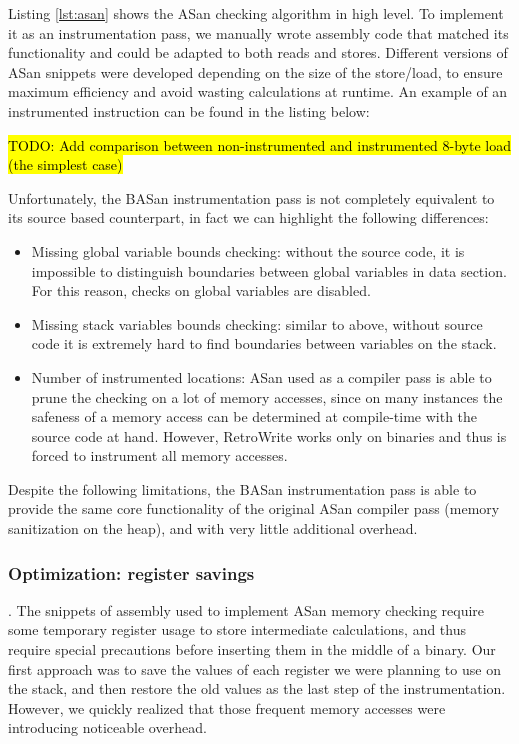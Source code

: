 \documentclass[a4paper,11pt,oneside]{report}
\newcommand{\sysname}{RetroWrite\xspace}
\newcommand{\todo}[1]{%
	\begingroup 
	\sethlcolor{cyan}%
	\hl{TODO: #1}%
	\endgroup
}
\begin{document}
Listing \ref{lst:asan} shows the ASan checking algorithm in high level. To 
implement it as an instrumentation pass, we manually wrote assembly code that 
matched its functionality and could be adapted to both reads and stores.  
Different versions of ASan snippets were developed depending on the size of the 
store/load, to ensure maximum efficiency and avoid wasting calculations at 
runtime. An example of an instrumented instruction can be found in the listing 
below:

\todo{Add comparison between non-instrumented and instrumented 8-byte load (the 
simplest case)}

Unfortunately, the BASan instrumentation pass is not completely equivalent to 
its source based counterpart, in fact we can highlight the following 
differences:
\begin{itemize}
	\item Missing global variable bounds checking: without the source code, it 
		is impossible to distinguish boundaries between global variables in 
		data section. For this reason, checks on global variables are disabled.
	\item Missing stack variables bounds checking: similar to above, without 
		source code it is extremely hard to find boundaries between variables 
		on the stack.
	\item Number of instrumented locations: ASan used as a compiler pass is 
		able to prune the checking on a lot of memory accesses, since on many 
		instances the safeness of a memory access can be determined at 
		compile-time with the source code at hand. However, \sysname works only 
		on binaries and thus is forced to instrument all memory accesses.
\end{itemize}
Despite the following limitations, the BASan instrumentation pass is able to 
provide the same core functionality of the original ASan compiler pass (memory 
sanitization on the heap), and with very little additional overhead.

\subsubsection{Optimization: register savings}.
The snippets of assembly used to implement ASan memory checking require some 
temporary register usage to store intermediate calculations, and thus require 
special precautions before inserting them in the middle of a binary. Our first 
approach was to save the values of each register we were planning to use on the 
stack, and then restore the old values as the last step of the instrumentation.  
However, we quickly realized that those frequent memory accesses were 
introducing noticeable overhead. 
\end{document}
